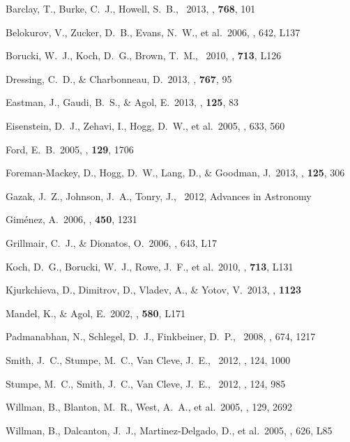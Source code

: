 \documentclass[letterpaper,12pt,preprint]{hack_aastex}
\begin{document}
\clearpage
\begin{thebibliography}{}\raggedright%

Barclay, T., Burke, C.~J., Howell, S.~B., \etal\ 2013, \apj, \textbf{768}, 101

Belokurov, V., Zucker, D.~B., Evans, N.~W., et al.\ 2006, \apjl, 642, L137

Borucki, W.~J., Koch, D.~G., Brown, T.~M., \etal\ 2010, \apjl,
\textbf{713}, L126

Dressing, C.~D., \& Charbonneau, D.\ 2013, \apj, \textbf{767}, 95

Eastman, J., Gaudi, B.~S., \& Agol, E.\ 2013, \pasp, \textbf{125}, 83

Eisenstein, D.~J., Zehavi, I., Hogg, D.~W., et al.\ 2005, \apj, 633, 560

Ford, E.~B.\ 2005, \aj, \textbf{129}, 1706

Foreman-Mackey, D., Hogg, D.~W., Lang, D., \& Goodman, J.\ 2013,
\pasp, \textbf{125}, 306

Gazak, J.~Z., Johnson, J.~A., Tonry, J., \etal\ 2012, Advances in Astronomy

Gim{\'e}nez, A.\ 2006, \aap, \textbf{450}, 1231

Grillmair, C.~J., \& Dionatos, O.\ 2006, \apjl, 643, L17

Koch, D.~G., Borucki, W.~J., Rowe, J.~F., et al.\ 2010, \apjl,
\textbf{713}, L131

Kjurkchieva, D., Dimitrov, D., Vladev, A., \& Yotov, V.\ 2013, \mnras,
\textbf{1123}

Mandel, K., \& Agol, E.\ 2002, \apjl, \textbf{580}, L171

Padmanabhan, N., Schlegel, D.~J., Finkbeiner, D.~P., \etal\ 2008, \apj, 674, 1217

Smith, J.~C., Stumpe, M.~C., Van Cleve, J.~E., \etal\ 2012, \pasp, 124, 1000

Stumpe, M.~C., Smith, J.~C., Van Cleve, J.~E., \etal\ 2012, \pasp, 124, 985

Willman, B., Blanton, M.~R., West, A.~A., et al.\ 2005, \aj, 129, 2692

Willman, B., Dalcanton, J.~J., Martinez-Delgado, D., et al.\ 2005, \apjl, 626, L85
\end{thebibliography}
\end{document}
